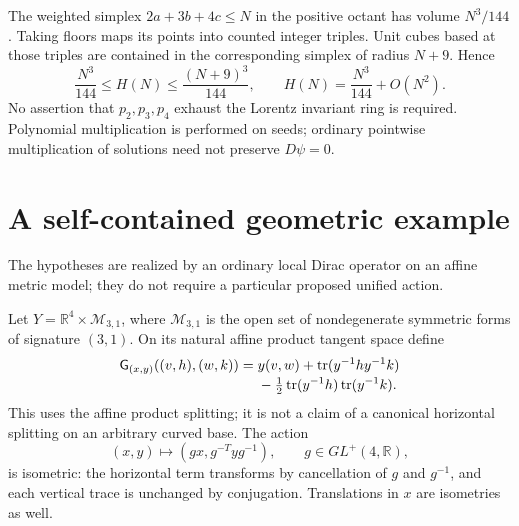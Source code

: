 \documentclass[11pt]{article}
\theoremstyle{definition}\newtheorem{definition}[theorem]{Definition}
\theoremstyle{remark}\newtheorem{remark}[theorem]{Remark}
\DeclareMathOperator{\tr}{tr}
\newcommand{\R}{\mathbb R}\newcommand{\C}{\mathbb C}
\begin{document}
The weighted simplex $2a+3b+4c\le N$ in the positive octant has volume $N^3/144$. Taking floors maps its points into counted integer triples. Unit cubes based at those triples are contained in the corresponding simplex of radius $N+9$. Hence
\[
 \frac{N^3}{144}\le H(N)\le\frac{(N+9)^3}{144},
 \qquad H(N)=\frac{N^3}{144}+O(N^2).
\]
No assertion that $p_2,p_3,p_4$ exhaust the Lorentz invariant ring is required. Polynomial multiplication is performed on seeds; ordinary pointwise multiplication of solutions need not preserve $D\psi=0$.

\section{A self-contained geometric example}\label{sec:example}
The hypotheses are realized by an ordinary local Dirac operator on an affine metric model; they do not require a particular proposed unified action.

Let $Y=\R^4\times\mathcal M_{3,1}$, where $\mathcal M_{3,1}$ is the open set of nondegenerate symmetric forms of signature $(3,1)$. On its natural affine product tangent space define
\begin{align}\label{eq:G}
 \mathsf G_{(x,y)}((v,h),(w,k))={}&y(v,w)
 +\tr(y^{-1}hy^{-1}k)\notag\\[-2pt]
 &-\tfrac12\tr(y^{-1}h)\tr(y^{-1}k).
\end{align}
This uses the affine product splitting; it is not a claim of a canonical horizontal splitting on an arbitrary curved base. The action
\[
 (x,y)\longmapsto(gx,g^{-T}yg^{-1}),\qquad g\in GL^+(4,\R),
\]
is isometric: the horizontal term transforms by cancellation of $g$ and $g^{-1}$, and each vertical trace is unchanged by conjugation. Translations in $x$ are isometries as well.
\end{document}
